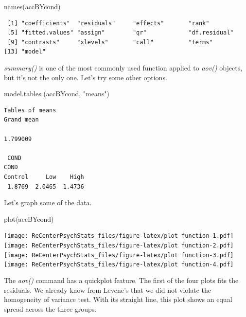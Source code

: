 \documentclass[
  english,
]{book}
\newenvironment{Shaded}{\begin{snugshade}}{\end{snugshade}}
\newcommand{\FunctionTok}[1]{\textcolor[rgb]{0.00,0.00,0.00}{#1}}
\newcommand{\NormalTok}[1]{#1}
\newcommand{\StringTok}[1]{\textcolor[rgb]{0.31,0.60,0.02}{#1}}
\begin{document}
\begin{Shaded}
\begin{Highlighting}[]
\FunctionTok{names}\NormalTok{(accBYcond)}
\end{Highlighting}
\end{Shaded}

\begin{verbatim}
 [1] "coefficients"  "residuals"     "effects"       "rank"         
 [5] "fitted.values" "assign"        "qr"            "df.residual"  
 [9] "contrasts"     "xlevels"       "call"          "terms"        
[13] "model"        
\end{verbatim}

\emph{summary()} is one of the most commonly used function applied to \emph{aov()} objects, but it's not the only one.
Let's try some other options.

\begin{Shaded}
\begin{Highlighting}[]
\FunctionTok{model.tables}\NormalTok{ (accBYcond, }\StringTok{"means"}\NormalTok{)}
\end{Highlighting}
\end{Shaded}

\begin{verbatim}
Tables of means
Grand mean
         
1.799009 

 COND 
COND
Control     Low    High 
 1.8769  2.0465  1.4736 
\end{verbatim}

Let's graph some of the data.

\begin{Shaded}
\begin{Highlighting}[]
\FunctionTok{plot}\NormalTok{(accBYcond) }
\end{Highlighting}
\end{Shaded}

\texttt{[image: ReCenterPsychStats\_files/figure-latex/plot function-1.pdf]} \texttt{[image: ReCenterPsychStats\_files/figure-latex/plot function-2.pdf]} \texttt{[image: ReCenterPsychStats\_files/figure-latex/plot function-3.pdf]} \texttt{[image: ReCenterPsychStats\_files/figure-latex/plot function-4.pdf]}

The \emph{aov()} command has a quickplot feature. The first of the four plots fits the residuals. We already know from Levene's that we did not violate the homogeneity of variance test. With its straight line, this plot shows an equal spread across the three groups.
\end{document}
